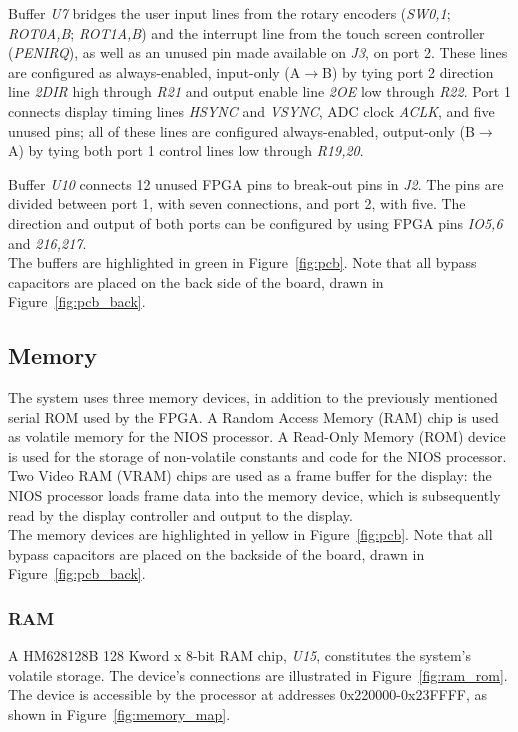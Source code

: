 \documentclass[titlepage]{scrartcl}
\begin{document}
	Buffer \textit{U7} bridges the user input lines from the rotary encoders (\textit{SW0,1}; \textit{ROT0A,B}; \textit{ROT1A,B}) and the interrupt line from the touch screen controller (\textit{PENIRQ}), as well as an unused pin made available on \textit{J3}, on port 2. These lines are configured as always-enabled, input-only (A$\rightarrow$B) by tying port 2 direction line \textit{2DIR} high through \textit{R21} and output enable line \textit{2OE} low through \textit{R22}. Port 1 connects display timing lines \textit{HSYNC} and \textit{VSYNC}, ADC clock \textit{ACLK}, and five unused pins; all of these lines are configured always-enabled, output-only (B$\rightarrow$A) by tying both port 1 control lines low through \textit{R19,20}.

	Buffer \textit{U10} connects 12 unused FPGA pins to break-out pins in \textit{J2}. The pins are divided between port 1, with seven connections, and port 2, with five. The direction and output of both ports can be configured by using FPGA pins \textit{IO5,6} and \textit{216,217}.\\

	The buffers are highlighted in green in Figure~\ref{fig:pcb}. Note that all bypass capacitors are placed on the back side of the board, drawn in Figure~\ref{fig:pcb_back}.\\

	\clearpage

	\subsection{Memory}
	The system uses three memory devices, in addition to the previously mentioned serial ROM used by the FPGA. A Random Access Memory (RAM) chip is used as volatile memory for the NIOS processor. A Read-Only Memory (ROM) device is used for the storage of non-volatile constants and code for the NIOS processor. Two Video RAM (VRAM) chips are used as a frame buffer for the display: the NIOS processor loads frame data into the memory device, which is subsequently read by the display controller and output to the display.\\

	The memory devices are highlighted in yellow in Figure~\ref{fig:pcb}. Note that all bypass capacitors are placed on the backside of the board, drawn in Figure~\ref{fig:pcb_back}.\\
	
	\subsubsection{RAM \label{sec:ram}}
	A HM628128B 128 Kword x 8-bit RAM chip, \textit{U15}, constitutes the system's volatile storage. The device's connections are illustrated in Figure~\ref{fig:ram_rom}. The device is accessible by the processor at addresses 0x220000-0x23FFFF, as shown in Figure~\ref{fig:memory_map}.\\
\end{document}
